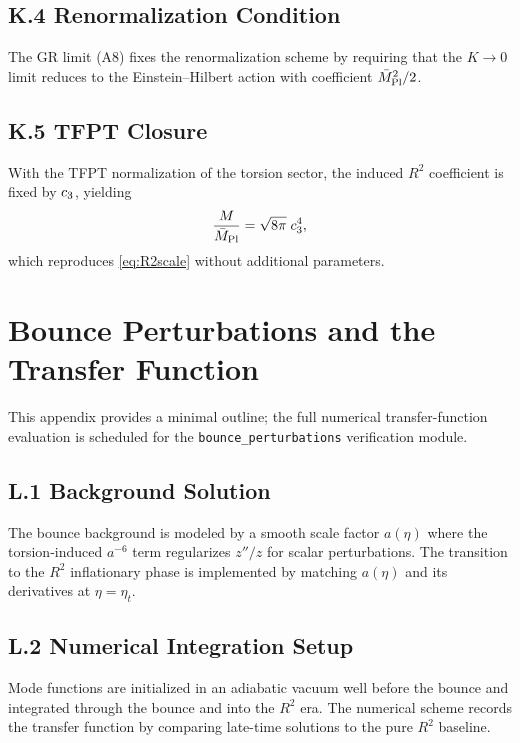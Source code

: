 \subsection{K.4 Renormalization Condition}
The GR limit (A8) fixes the renormalization scheme by requiring that the $K\to 0$ limit
reduces to the Einstein--Hilbert action with coefficient $\bar{M}_{\mathrm{Pl}}^2/2$.

\subsection{K.5 TFPT Closure}
With the TFPT normalization of the torsion sector, the induced $R^2$ coefficient is fixed by
$c_3$, yielding
\begin{equation}
    \frac{M}{\bar{M}_{\mathrm{Pl}}}=\sqrt{8\pi}\;c_3^4,
\end{equation}
which reproduces \eqref{eq:R2scale} without additional parameters.

\section{Bounce Perturbations and the Transfer Function}
\label{app:bounce}

\begin{tcolorbox}[colback=gray!5, colframe=gray!60, 
    title={\textbf{Status Note}}, fonttitle=\bfseries\small]
This appendix provides a minimal outline; the full numerical transfer-function evaluation
is scheduled for the \texttt{bounce\_perturbations} verification module.
\end{tcolorbox}

\subsection{L.1 Background Solution}
The bounce background is modeled by a smooth scale factor $a(\eta)$ where the torsion-induced
$a^{-6}$ term regularizes $z''/z$ for scalar perturbations. The transition to the $R^2$
inflationary phase is implemented by matching $a(\eta)$ and its derivatives at $\eta=\eta_t$.

\subsection{L.2 Numerical Integration Setup}
Mode functions are initialized in an adiabatic vacuum well before the bounce and integrated
through the bounce and into the $R^2$ era. The numerical scheme records the transfer function
by comparing late-time solutions to the pure $R^2$ baseline.


